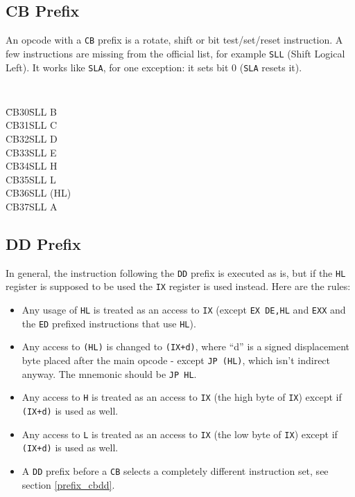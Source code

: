\subsection{CB Prefix \cite{gerton}}
\label{prefix_cb}

An opcode with a {\tt CB} prefix is a rotate, shift or bit test/set/reset instruction. A few instructions are missing from the official list, for example {\tt SLL} (Shift Logical Left). It works like {\tt SLA}, for one exception: it sets bit 0 ({\tt SLA} resets it).

{\tt 
  \begin{tabbing}
	{\qquad}\=CB30\qquad\=SLL B \+\\
	   CB31\>SLL C\\
	   CB32\>SLL D\\
	   CB33\>SLL E\\
	   CB34\>SLL H\\
	   CB35\>SLL L\\
	   CB36\>SLL (HL)\\
	   CB37\>SLL A
	\end{tabbing}
}


\subsection{DD Prefix \cite{gerton}}

In general, the instruction following the {\tt DD} prefix is executed as is, but if the {\tt HL} register is supposed to be used the {\tt IX} register is used instead. Here are the rules:

\begin{itemize}[topsep=1pt,itemsep=1pt]
	\item Any usage of {\tt HL} is treated as an access to {\tt IX} (except {\tt EX DE,HL} and {\tt EXX} and the {\tt ED} prefixed instructions that use {\tt HL}).
	
	\item Any access to {\tt (HL)} is changed to {\tt (IX+d)}, where ``d'' is a signed displacement byte placed after the main opcode - except {\tt JP (HL)}, which isn't indirect anyway. The mnemonic should be {\tt JP HL}.
	
	\item Any access to {\tt H} is treated as an access to {\tt IX\High} (the high byte of {\tt IX}) except if {\tt (IX+d)} is used as well.
	
	\item Any access to {\tt L} is treated as an access to {\tt IX\Low} (the low byte of {\tt IX}) except if {\tt (IX+d)} is used as well.
	
	\item A {\tt DD} prefix before a {\tt CB} selects a completely different instruction set, see section {\ref{prefix_cbdd}}.
\end{itemize}

